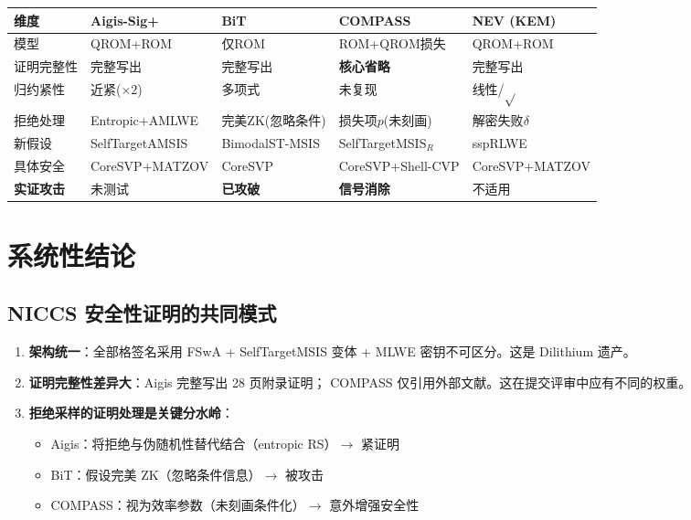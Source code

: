 \documentclass[11pt,a4paper]{ctexart}
\begin{document}
\begin{table}[htbp]\centering\small
\begin{tabular}{@{}lllll@{}}
\toprule
维度 & Aigis-Sig+ & BiT & COMPASS & NEV (KEM) \\
\midrule
模型 & QROM+ROM & 仅ROM & ROM+QROM损失 & QROM+ROM \\
证明完整性 & 完整写出 & 完整写出 & \textbf{核心省略} & 完整写出 \\
归约紧性 & 近紧($\times 2$) & 多项式 & 未复现 & 线性/$\sqrt{}$ \\
拒绝处理 & Entropic+AMLWE & 完美ZK(忽略条件) & 损失项$p$(未刻画) & 解密失败$\delta$ \\
新假设 & SelfTargetAMSIS & BimodalST-MSIS & SelfTargetMSIS$_R$ & sspRLWE \\
具体安全 & CoreSVP+MATZOV & CoreSVP & CoreSVP+Shell-CVP & CoreSVP+MATZOV \\
\textbf{实证攻击} & 未测试 & \textbf{已攻破} & \textbf{信号消除} & 不适用 \\
\bottomrule
\end{tabular}
\end{table}

\section{系统性结论}

\subsection{NICCS 安全性证明的共同模式}

\begin{enumerate}
  \item \textbf{架构统一}：全部格签名采用 FSwA + SelfTargetMSIS 变体
        + MLWE 密钥不可区分。这是 Dilithium 遗产。
  \item \textbf{证明完整性差异大}：Aigis 完整写出 28 页附录证明；
        COMPASS 仅引用外部文献。这在提交评审中应有不同的权重。
  \item \textbf{拒绝采样的证明处理是关键分水岭}：
    \begin{itemize}
      \item Aigis：将拒绝与伪随机性替代结合（entropic RS）$\to$ 紧证明
      \item BiT：假设完美 ZK（忽略条件信息）$\to$ 被攻击
      \item COMPASS：视为效率参数（未刻画条件化）$\to$ 意外增强安全性
    \end{itemize}
\end{enumerate}
\end{document}
